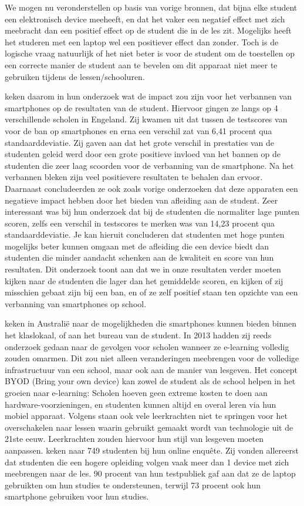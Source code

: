 We mogen nu veronderstellen op basis van vorige bronnen, dat bijna elke student een elektronisch device meeheeft, en dat het vaker een negatief effect met zich meebracht dan een positief effect op de student die in de les zit. Mogelijks heeft het studeren met een laptop wel een positiever effect dan zonder. Toch is de logische vraag natuurlijk of het niet beter is voor de student om de toestellen op een correcte manier de student aan te bevelen om dit apparaat niet meer te gebruiken tijdens de lessen/schooluren.

\textcite{Beland2016} keken daarom in hun onderzoek wat de impact zou zijn voor het verbannen van smartphones op de resultaten van de student. Hiervoor gingen ze langs op 4 verschillende scholen in Engeland. Zij kwamen uit dat tussen de testscores van voor de ban op smartphones en erna een verschil zat van 6,41 procent qua standaarddeviatie. Zij gaven aan dat het grote verschil in prestaties van de studenten geleid werd door een grote positieve invloed van het bannen op de studenten die zeer laag scoorden voor de verbanning van de smartphone. Na het verbannen bleken zijn veel positievere resultaten te behalen dan ervoor. Daarnaast concludeerden ze ook zoals vorige onderzoeken dat deze apparaten een negatieve impact hebben door het bieden van afleiding aan de student. Zeer interessant was bij hun onderzoek dat bij de studenten die normaliter lage punten scoren, zelfs een verschil in testscores te merken was van 14,23 procent qua standaarddeviatie. Je kan hieruit concluderen dat studenten met hoge punten mogelijks beter kunnen omgaan met de afleiding die een device biedt dan studenten die minder aandacht schenken aan de kwaliteit en score van hun resultaten. Dit onderzoek toont aan dat we in onze resultaten verder moeten kijken naar de studenten die lager dan het gemiddelde scoren, en kijken of zij misschien gebaat zijn bij een ban, en of ze zelf positief staan ten opzichte van een verbanning van smartphones op school.

\textcite{Farley2015} keken in Australië naar de mogelijkheden die smartphones kunnen bieden binnen het klaslokaal, of aan het bureau van de student. In 2013 hadden zij reeds onderzoek gedaan naar de gevolgen voor scholen wanneer ze e-learning volledig zouden omarmen. Dit zou niet alleen veranderingen meebrengen voor de volledige infrastructuur van een school, maar ook aan de manier van lesgeven. Het concept BYOD (Bring your own device) kan zowel de student als de school helpen in het groeien naar e-learning: Scholen hoeven geen extreme kosten te doen aan hardware-voorzieningen, en studenten kunnen altijd en overal leren via hun mobiel apparaat. Volgens \textcite{Crompton2014} staan ook vele leerkrachten niet te springen voor het overschakelen naar lessen waarin gebruikt gemaakt wordt van technologie uit de 21ste eeuw. Leerkrachten zouden hiervoor hun stijl van lesgeven moeten aanpassen. \textcite{Farley2015} keken naar 749 studenten bij hun online enquête. Zij vonden allereerst dat studenten die een hogere opleiding volgen vaak meer dan 1 device met zich meebrengen naar de les. 90 procent van hun testpubliek gaf aan dat ze de laptop gebruikten om hun studies te ondersteunen, terwijl 73 procent ook hun smartphone gebruiken voor hun studies. 

